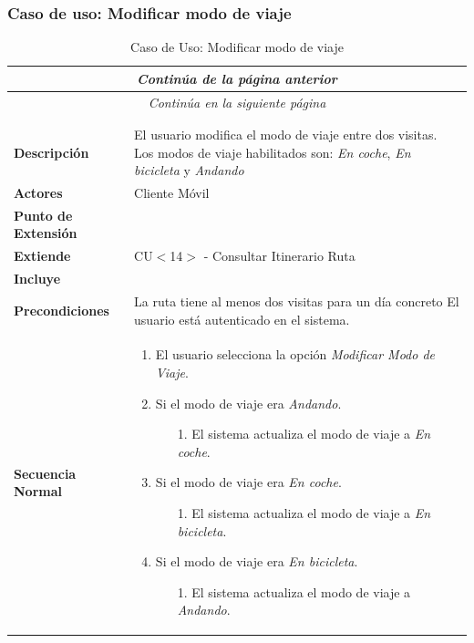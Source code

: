 \subsubsection*{Caso de uso: Modificar modo de viaje }
\begin{longtable}{| p{4cm} | p{10cm} |}
\endfirsthead
\multicolumn{2}{c}{\textit{Continúa de la página anterior}}\\[12pt]
\hline
\endhead
\hline
\multicolumn{2}{c}{\textit{Continúa en la siguiente página}} \\
\endfoot
\hline
\caption{Caso de Uso: Modificar modo de viaje}\label{fig:1}\\
\endlastfoot


\hline
\multicolumn{2}{|c|}{\textbf{CU$<$19$>$ - Modificar Modo de Viaje}} \\

\hline
\textbf{Descripción} &
El usuario modifica el modo de viaje entre dos visitas. Los modos de viaje habilitados son: \textit{En coche}, \textit{En bicicleta} y \textit{Andando}\\

\hline
\textbf{Actores} &
Cliente Móvil\\

\hline
\textbf{Punto de Extensión} &
\\

\hline
\textbf{Extiende} &
CU$<$14$>$ - Consultar Itinerario Ruta
\\

\hline
\textbf{Incluye} &
\\

\hline
\textbf{Precondiciones} &
La ruta tiene al menos dos visitas para un día concreto\newline
El usuario está autenticado en el sistema.\\

\hline
\textbf{Secuencia Normal} &\mbox{}\par\vspace{-\baselineskip}
\begin{enumerate}[leftmargin=0.7cm, topsep=0.1cm]
\item El usuario selecciona la opción \textit{Modificar Modo de Viaje}.
\item Si el modo de viaje era \textit{Andando}.
	\begin{itemize}
	\item [1.] El sistema actualiza el modo de viaje a \textit{En coche}.
	\end{itemize}
\item Si el modo de viaje era \textit{En coche}.
	\begin{itemize}
	\item [1.] El sistema actualiza el modo de viaje a \textit{En bicicleta}.
	\end{itemize}
\item Si el modo de viaje era \textit{En bicicleta}.
	\begin{itemize}
	\item [1.] El sistema actualiza el modo de viaje a \textit{Andando}.
	\end{itemize}


\end{enumerate}
\end{longtable}
